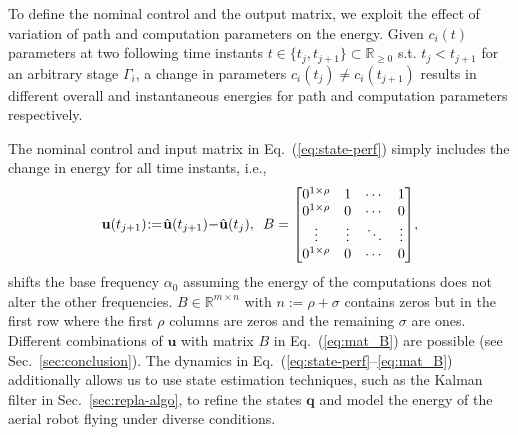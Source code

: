 \documentclass[letterpaper,10pt,conference,twoside]{IEEEtran}
\theoremstyle{definition}
\newtheorem{lem}[thm]{Lemma}
\begin{document}

To define the nominal control and the output matrix, we exploit the effect of variation of path and computation parameters on the energy. 
  Given $c_i(t)$ parameters at two following time instants $t\in\{t_j,t_{j+1}\}\subset\mathbb{R}_{\geq 0}$ s.t. $t_j<t_{j+1}$ for an arbitrary stage $\Gamma_i$, a change in parameters $c_i(t_j)\neq c_i(t_{j+1})$ results in different overall and instantaneous energies for path and computation parameters respectively.


%
The nominal control and input matrix in Eq.~(\ref{eq:state-perf}) simply includes the change in energy for all time instants, i.e.,
\begin{equation}\label{eq:mat_B}{\small
  \mathbf{u}(t_{j+1})\hspace*{-.5ex}:=\hspace*{-.5ex}\hat{\mathbf{u}}(t_{j+1})\hspace*{-.5ex}-\hspace*{-.5ex}\hat{\mathbf{u}}(t_j),\,\,\,B=\begin{bmatrix}
      0^{1\times\rho} & 1      & \cdots & 1      \\
      0^{1\times\rho} & 0      & \cdots & 0      \\ 
      \vdots          & \vdots & \ddots & \vdots \\
      0^{1\times\rho} & 0      & \cdots & 0   
  \end{bmatrix}},
\end{equation}
shifts the base frequency $\alpha_0$ assuming the energy of the computations does not alter the other frequencies. $B\in\mathbb{R}^{m\times n}$ with $n:=\rho+\sigma$ contains zeros but in the first row where the first $\rho$ columns are zeros and the remaining $\sigma$ are ones. Different combinations of $\mathbf{u}$ with matrix $B$ in Eq.~(\ref{eq:mat_B}) are possible %
{\color{black}(see }Sec.~\ref{sec:conclusion}{\color{black})}.
The dynamics in Eq.~(\ref{eq:state-perf}--\ref{eq:mat_B}) additionally allows us to use state estimation techniques, such as the Kalman filter in Sec.~\ref{sec:repla-algo}, to refine the states $\mathbf{q}$ and model the energy of the aerial robot flying under diverse %
conditions.
\end{document}
